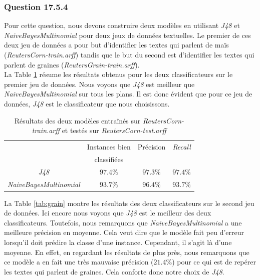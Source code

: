 \documentclass[11pt,a4paper]{article}
\begin{document}
			\subsubsection*{Question 17.5.4}
			
			  Pour cette question, nous devons construire deux modèles en utilisant \textit{J48} et \textit{NaiveBayesMultinomial} pour deux jeux de données textuelles. Le premier de ces deux jeu de données a pour but d'identifier les textes qui parlent de maïs (\textit{ReutersCorn-train.arff}) tandis que le but du second est d'identifier les textes qui parlent de graines (\textit{ReutersGrain-train.arff}).\\
			  
			  La Table \ref{tab:corn} résume les résultats obtenus pour les deux classificateurs sur le premier jeu de données. Nous voyons que \textit{J48} est meilleur que \textit{NaiveBayesMultinomial} sur tous les plans. Il est donc évident que pour ce jeu de données, \textit{J48} est le classificateur que nous choisissons.\\ 
			  
			  \begin{table}[h]
			  	\centering
			  	\caption{Résultats des deux modèles entraînés sur \textit{ReutersCorn-train.arff} et testés sur \textit{ReutersCorn-test.arff}}
			  	\label{tab:corn}
		  		\begin{tabular}{|c|c|c|c|}
		  			\hline
		  			&Instances bien  & Précision & \textit{Recall}\\
		  			& classifiées  &  & \\ 
		  			\hline
		  			\textit{J48} & $97.4 \%$ & $97.3\%$ & $97.4\%$ \\
		  			\hline
		  			\textit{NaiveBayesMultinomial}& $93.7\%$ & $96.4\%$ & $93.7\%$ \\
		  			\hline
		  		\end{tabular}
			  \end{table}
			  
			  La Table \ref{tab:grain} montre les résultats des deux classificateurs sur le second jeu de données. Ici encore nous voyons que \textit{J48} est le meilleur des deux classificateurs. Toutefois, nous remarquons que \textit{NaiveBayesMultinomial} a une meilleure précision en moyenne. Cela veut dire que le modèle fait peu d'erreur lorsqu'il doit prédire la classe d'une instance. Cependant, il s'agit là d'une moyenne. En effet, en regardant les résultats de plus près, nous remarquons que ce modèle a en fait une très mauvaise précision ($21.4 \%$) pour ce qui est de repérer les textes qui parlent de graines. Cela conforte donc notre choix de \textit{J48}.
			  
\end{document}
